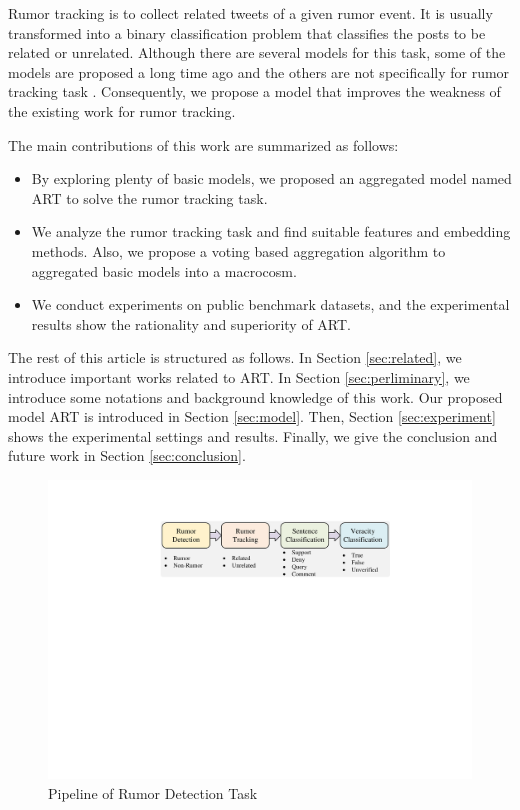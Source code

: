 Rumor tracking is to collect related tweets of a given rumor event. It is usually transformed into a binary classification problem that classifies the posts to be related or unrelated. Although there are several models for this task, some of the models are proposed a long time ago \cite{DBLP:conf/emnlp/QazvinianRRM11} and the others are not specifically for rumor tracking task \cite{DBLP:conf/www/ChengNB20}.
Consequently, we propose a model that improves the weakness of the existing work for rumor tracking.

The main contributions of this work are summarized as follows:
\begin{itemize}
	\item By exploring plenty of basic models, we proposed an aggregated model named ART to solve the rumor tracking task. 
	\item We analyze the rumor tracking task and find suitable features and embedding methods. Also, we propose a voting based aggregation algorithm to aggregated basic models into a macrocosm.
	\item We conduct experiments on public benchmark datasets, and the experimental results show the rationality and superiority of ART.
\end{itemize}

The rest of this article is structured as follows. In Section \ref{sec:related}, we introduce important works related to ART. In Section \ref{sec:perliminary}, we introduce some notations and background knowledge of this work. Our proposed model ART is introduced in Section \ref{sec:model}. Then, Section \ref{sec:experiment} shows the experimental settings and results. Finally, we give the conclusion and future work in Section \ref{sec:conclusion}.

\begin{figure}[tbp]
	\hspace{0ex}
	\vspace{0ex}
	\centering
	\includegraphics[width = \textwidth]{fig/pipeline}
	\caption{Pipeline of Rumor Detection Task}
	\label{fig:pipeline}
\end{figure}